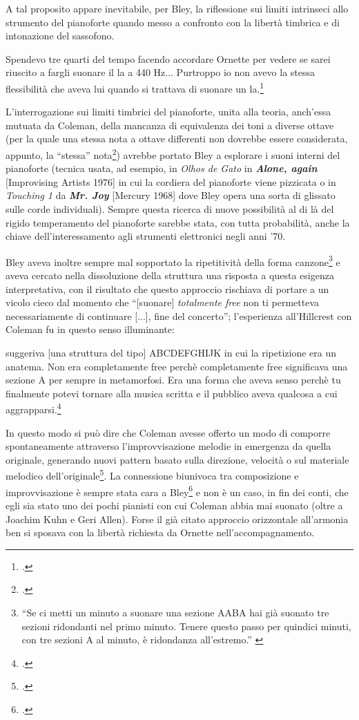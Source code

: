 A tal proposito appare inevitabile, per Bley, la riflessione sui limiti intrinseci allo strumento del pianoforte quando messo a confronto con la libertà timbrica e di intonazione del sassofono.
\begin{fquote}
	Spendevo tre quarti del tempo facendo accordare Ornette per vedere se sarei riuscito a fargli suonare il la a 440 Hz... Purtroppo io non avevo la stessa flessibilità che aveva lui quando si trattava di suonare un la.\footcite[62]{litweiler}
\end{fquote}
L'interrogazione sui limiti timbrici del pianoforte, unita alla teoria, anch'essa mutuata da Coleman, della mancanza di equivalenza dei toni a diverse ottave (per la quale una stessa nota a ottave differenti non dovrebbe essere considerata, appunto, la ``stessa'' nota\footcite[110]{dean}) avrebbe portato Bley a esplorare i suoni interni del pianoforte (tecnica usata, ad esempio, in \textit{Olhos de Gato} in \textit{\textbf{Alone, again}} [Improvising Artists 1976] in cui la cordiera del pianoforte viene pizzicata o in \textit{Touching 1} da \textit{\textbf{Mr. Joy}} [Mercury 1968] dove Bley opera una sorta di glissato sulle corde individuali). Sempre questa ricerca di nuove possibilità al di là del rigido temperamento del pianoforte sarebbe stata, con tutta probabilità, anche la chiave dell'interessamento agli strumenti elettronici negli anni '70.\par
Bley aveva inoltre sempre mal sopportato la ripetitività della forma canzone\footnote{``{Se ci metti un minuto a suonare una sezione AABA hai già suonato tre sezioni ridondanti nel primo minuto. Tenere questo passo per quindici minuti, con tre sezioni A al minuto, è ridondanza all'estremo}.'' \cite[25]{stopping}} e aveva cercato nella dissoluzione della struttura una risposta a questa esigenza interpretativa, con il risultato che questo approccio rischiava di portare a un vicolo cieco dal momento che ``[suonare] \textit{totalmente free} non ti permetteva necessariamente di continuare [...], fine del concerto''; l'esperienza all'Hillcrest con Coleman fu in questo senso illuminante: 
\begin{fquote}
	suggeriva [una struttura del tipo] ABCDEFGHIJK in cui la ripetizione era un anatema. Non era completamente free perchè completamente free significava una sezione A per sempre in metamorfosi. Era una forma che aveva senso perchè tu finalmente potevi tornare alla musica scritta e il pubblico aveva qualcosa a cui aggrapparsi.\footcite{hamilton}
\end{fquote}
In questo modo si può dire che Coleman avesse offerto un modo di comporre spontaneamente attraverso l'improvvisazione melodie in emergenza da quella originale, generando nuovi pattern basato sulla direzione, velocità o sul materiale melodico dell'originale\footcite[305]{gluck}. La connessione biunivoca tra composizione e improvvisazione è sempre stata cara a Bley\footcite[22]{cappelletti} e non è un caso, in fin dei conti, che egli sia stato uno dei pochi pianisti con cui Coleman abbia mai suonato (oltre a Joachim Kuhn e Geri Allen). Forse il già citato approccio orizzontale all'armonia ben si sposava con la libertà richiesta da Ornette nell'accompagnamento.\par
